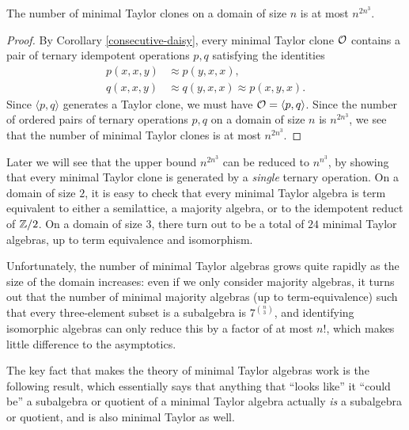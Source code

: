 \documentclass[letterpaper,11pt]{article}
\begin{document}
\begin{prop} The number of minimal Taylor clones on a domain of size $n$ is at most $n^{2n^3}$.
\end{prop}
\begin{proof} By Corollary \ref{consecutive-daisy}, every minimal Taylor clone $\mathcal{O}$ contains a pair of ternary idempotent operations $p,q$ satisfying the identities
\begin{align*}
p(x,x,y) &\approx p(y,x,x),\\
q(x,x,y) &\approx q(y,x,x) \approx p(x,y,x).
\end{align*}
Since $\langle p,q\rangle$ generates a Taylor clone, we must have $\mathcal{O} = \langle p,q\rangle$. Since the number of ordered pairs of ternary operations $p,q$ on a domain of size $n$ is $n^{2n^3}$, we see that the number of minimal Taylor clones is at most $n^{2n^3}$.
\end{proof}

\begin{rem}
Later we will see that the upper bound $n^{2n^3}$ can be reduced to $n^{n^3}$, by showing that every minimal Taylor clone is generated by a \emph{single} ternary operation. On a domain of size $2$, it is easy to check that every minimal Taylor algebra is term equivalent to either a semilattice, a majority algebra, or to the idempotent reduct of $\mathbb{Z}/2$. On a domain of size $3$, there turn out to be a total of $24$ minimal Taylor algebras, up to term equivalence and isomorphism.

Unfortunately, the number of minimal Taylor algebras grows quite rapidly as the size of the domain increases: even if we only consider majority algebras, it turns out that the number of minimal majority algebras (up to term-equivalence) such that every three-element subset is a subalgebra is $7^{\binom{n}{3}}$, and identifying isomorphic algebras can only reduce this by a factor of at most $n!$, which makes little difference to the asymptotics.
\end{rem}

The key fact that makes the theory of minimal Taylor algebras work is the following result, which essentially says that anything that ``looks like'' it ``could be'' a subalgebra or quotient of a minimal Taylor algebra actually \emph{is} a subalgebra or quotient, and is also minimal Taylor as well.
\end{document}
